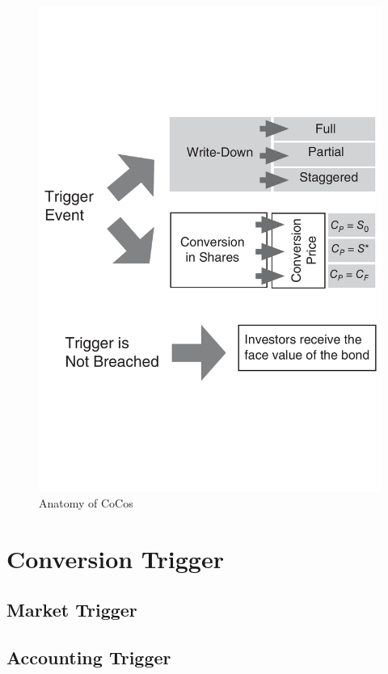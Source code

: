 \begin{figure}[ht]
	\centering
	\includegraphics[trim=0.6cm 7.05cm 0.9cm 7cm, scale = 0.4]{media/anatomy} \par
	\caption[Anatomy of CoCos]{Anatomy of CoCos \citep{de2014handbook}}
\end{figure}

\section{Conversion Trigger}

\subsection{Market Trigger}

\subsection{Accounting Trigger}


